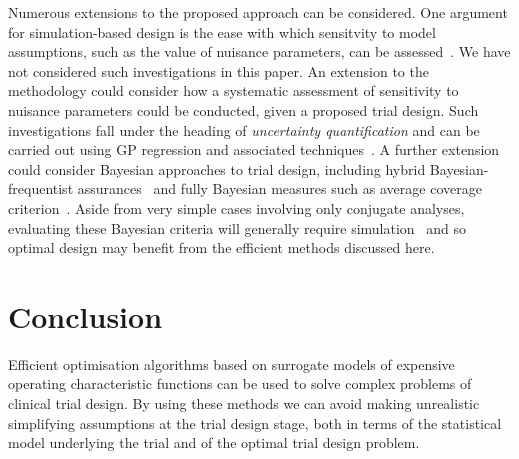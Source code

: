\documentclass{article} %
\begin{document}
Numerous extensions to the proposed approach can be considered. One argument for simulation-based design is the ease with which sensitvity to model assumptions, such as the value of nuisance parameters, can be assessed~\cite{Landau2013}. We have not considered such investigations in this paper. An extension to the methodology could consider how a systematic assessment of sensitivity to nuisance parameters could be conducted, given a proposed trial design. Such investigations fall under the heading of \emph{uncertainty quantification} and can be carried out using GP regression and associated techniques~\cite{Kennedy2001}. A further extension could consider Bayesian approaches to trial design, including hybrid Bayesian-frequentist assurances~\cite{OHagan2005} and fully Bayesian measures such as average coverage criterion~\cite{Cao2009}. Aside from very simple cases involving only conjugate analyses, evaluating these Bayesian criteria will generally require simulation~\cite{OHagan2005} and so optimal design may benefit from the efficient methods discussed here.

\section{Conclusion}

Efficient optimisation algorithms based on surrogate models of expensive operating characteristic functions can be used to solve complex problems of clinical trial design. By using these methods we can avoid making unrealistic simplifying assumptions at the trial design stage, both in terms of the statistical model underlying the trial and of the optimal trial design problem.


\end{document}
